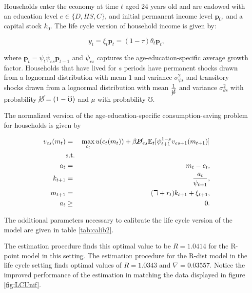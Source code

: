 \par Households enter the economy at time $t$ aged 24 years old and are endowed with an education level $e \in \{D,HS,C\}$, and initial permanent income level $\textbf{p}_0$, and a capital stock $k_0$. The life cycle version of household income is given by:

$$ y_t = \xi_t \textbf{p}_t = (1 - \tau) \theta_t \textbf{p}_t, $$

where $\textbf{p}_t = \psi_t \bar{\psi}_{es} \textbf{p}_{t-1}$ and $\bar{\psi}_{es}$ captures the age-education-specific average growth factor. Households that have lived for $s$ periods have permanent shocks drawn from a lognormal distribution with mean $1$ and variance $\sigma^{2}_{\psi s}$ and transitory shocks drawn from a lognormal distribution with mean $\frac{1}{\cancel{\mho}}$ and variance $\sigma^{2}_{\theta s}$ with probability $\cancel{\mho} = (1-\mho)$ and $\mu$ with probability $\mho$.

\par The normalized version of the age-education-specific consumption-saving problem for households is given by

\begin{eqnarray*}
  v_{es}(m_t) &=& \max_{c_t} u(c_t(m_t)) + \beta \cancel{D}_{es} \mathbb{E}_{t}[\psi_{t+1}^{1-\rho}v_{es + 1}(m_{t+1})] \\
  &\text{s.t.}& \\
  a_t &=& m_t - c_t, \\
  k_{t+1} &=& \frac{a_t}{\psi_{t+1}}, \\
  m_{t+1} &=& (\daleth + r_t)k_{t+1} + \xi_{t+1}, \\
  a_t &\geq& 0.
\end{eqnarray*}

\par The additional parameters necessary to calibrate the life cycle version of the model are given in table \ref{tab:calib2}.

\unskip

\par The estimation procedure finds this optimal value to be $R = 1.0414$ for the R-point model in this setting. The estimation procedure for the R-dist model in the life cycle setting finds optimal values of $R = 1.0343$ and $\nabla =0.03557$. Notice the improved performance of the estimation in matching the data displayed in figure \ref{fig:LCUnif}.

